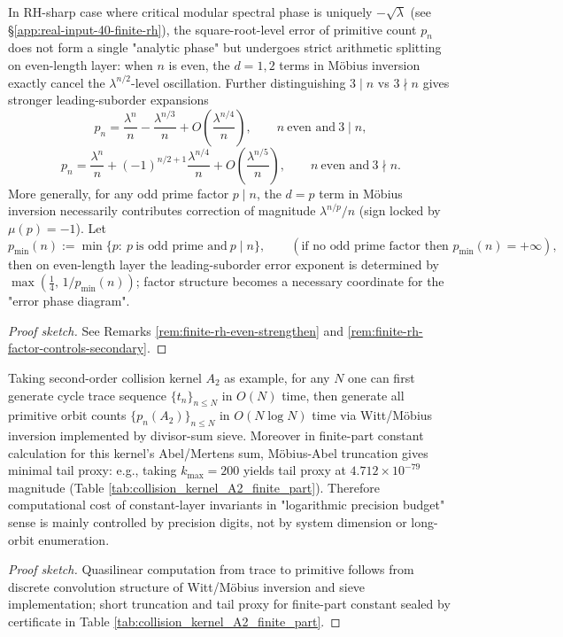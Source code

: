 \begin{conclusion}\label{con:xi-terminal-rhsharp-arithmetic-phase-splitting}
In RH-sharp case where critical modular spectral phase is uniquely \(-\sqrt\lambda\) (see \S\ref{app:real-input-40-finite-rh}), the square-root-level error of primitive count \(p_n\) does not form a single "analytic phase" but undergoes strict arithmetic splitting on even-length layer:
when \(n\) is even, the \(d=1,2\) terms in Möbius inversion exactly cancel the \(\lambda^{n/2}\)-level oscillation.
Further distinguishing \(3\mid n\) vs \(3\nmid n\) gives stronger leading-suborder expansions
\[
p_n=\frac{\lambda^n}{n}-\frac{\lambda^{n/3}}{n}+O\!\left(\frac{\lambda^{n/4}}{n}\right),
\qquad n\ \text{even and}\ 3\mid n,
\]
\[
p_n=\frac{\lambda^n}{n}+(-1)^{n/2+1}\frac{\lambda^{n/4}}{n}+O\!\left(\frac{\lambda^{n/5}}{n}\right),
\qquad n\ \text{even and}\ 3\nmid n.
\]
More generally, for any odd prime factor \(p\mid n\), the \(d=p\) term in Möbius inversion necessarily contributes correction of magnitude \(\lambda^{n/p}/n\) (sign locked by \(\mu(p)=-1\)).
Let
\[
p_{\min}(n):=\min\{p:\ p\ \text{is odd prime and}\ p\mid n\},
\qquad(\text{if no odd prime factor then }p_{\min}(n)=+\infty),
\]
then on even-length layer the leading-suborder error exponent is determined by \(\max(\tfrac14,\,1/p_{\min}(n))\);
factor structure becomes a necessary coordinate for the "error phase diagram".
\end{conclusion}
\begin{proof}[Proof sketch]
See Remarks \ref{rem:finite-rh-even-strengthen} and \ref{rem:finite-rh-factor-controls-secondary}.
\end{proof}

\begin{conclusion}\label{con:xi-terminal-constant-layer-bit-complexity}
Taking second-order collision kernel \(A_2\) as example, for any \(N\) one can first generate cycle trace sequence \(\{t_n\}_{n\le N}\) in \(O(N)\) time, then generate all primitive orbit counts \(\{p_n(A_2)\}_{n\le N}\) in \(O(N\log N)\) time via Witt/Möbius inversion implemented by divisor-sum sieve.
Moreover in finite-part constant calculation for this kernel's Abel/Mertens sum, Möbius-Abel truncation gives minimal tail proxy:
e.g., taking \(k_{\max}=200\) yields tail proxy at \(4.712\times 10^{-79}\) magnitude (Table \ref{tab:collision_kernel_A2_finite_part}).
Therefore computational cost of constant-layer invariants in "logarithmic precision budget" sense is mainly controlled by precision digits, not by system dimension or long-orbit enumeration.
\end{conclusion}
\begin{proof}[Proof sketch]
Quasilinear computation from trace to primitive follows from discrete convolution structure of Witt/Möbius inversion and sieve implementation;
short truncation and tail proxy for finite-part constant sealed by certificate in Table \ref{tab:collision_kernel_A2_finite_part}.
\end{proof}

